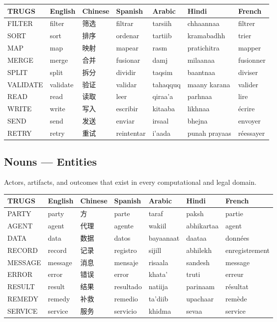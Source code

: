 \documentclass{article}
\begin{document}
\begin{CJK}{UTF8}{gbsn}
\begin{table}[h]
\centering
\small
\begin{tabular}{lllllll}
\toprule
\textbf{TRUGS} & \textbf{English} & \textbf{Chinese} & \textbf{Spanish} & \textbf{Arabic} & \textbf{Hindi} & \textbf{French} \\
\midrule
FILTER & filter & 筛选 & filtrar & tarsiih & chhaannaa & filtrer \\
SORT & sort & 排序 & ordenar & tartiib & kramabadhh & trier \\
MAP & map & 映射 & mapear & rasm & pratichitra & mapper \\
MERGE & merge & 合并 & fusionar & damj & milaanaa & fusionner \\
SPLIT & split & 拆分 & dividir & taqsim & baantnaa & diviser \\
VALIDATE & validate & 验证 & validar & tahaqquq & maany karana & valider \\
READ & read & 读取 & leer & qiraa'a & parhnaa & lire \\
WRITE & write & 写入 & escribir & kitaaba & likhnaa & \'ecrire \\
SEND & send & 发送 & enviar & irsaal & bhejna & envoyer \\
RETRY & retry & 重试 & reintentar & i'aada & punah prayaas & r\'eessayer \\
\bottomrule
\end{tabular}
\end{table}

\subsection{Nouns --- Entities}

Actors, artifacts, and outcomes that exist in every computational and legal domain.

\begin{table}[h]
\centering
\small
\begin{tabular}{lllllll}
\toprule
\textbf{TRUGS} & \textbf{English} & \textbf{Chinese} & \textbf{Spanish} & \textbf{Arabic} & \textbf{Hindi} & \textbf{French} \\
\midrule
PARTY & party & 方 & parte & taraf & paksh & partie \\
AGENT & agent & 代理 & agente & wakiil & abhikartaa & agent \\
DATA & data & 数据 & datos & bayaanaat & daataa & donn\'ees \\
RECORD & record & 记录 & registro & sijill & abhilekh & enregistrement \\
MESSAGE & message & 消息 & mensaje & risaala & sandesh & message \\
ERROR & error & 错误 & error & khata' & truti & erreur \\
RESULT & result & 结果 & resultado & natiija & parinaam & r\'esultat \\
REMEDY & remedy & 补救 & remedio & ta'diib & upachaar & rem\`ede \\
SERVICE & service & 服务 & servicio & khidma & sevaa & service \\
\bottomrule
\end{tabular}
\end{table}


\end{CJK}
\end{document}
